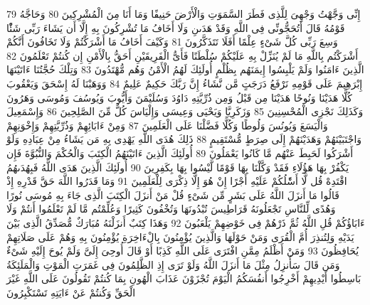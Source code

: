 \documentclass[20pt,a4paper]{article}
\begin{document}
{\tiny\colorbox{cl_aya}{79}} إِنِّى وَجَّهْتُ وَجْهِىَ لِلَّذِى فَطَرَ السَّمَوَتِ وَالْأَرْضَ حَنِيفًا وَمَا أَنَا مِنَ الْمُشْرِكِينَ
{\tiny\colorbox{cl_aya}{80}} وَحَاجَّهُ قَوْمُهُ قَالَ أَتُحَجُّونِّى فِى اللَّهِ وَقَدْ هَدَىنِ وَلَا أَخَافُ مَا تُشْرِكُونَ بِهِ إِلَّا أَن يَشَاءَ رَبِّى شَئًْا وَسِعَ رَبِّى كُلَّ شَىْءٍ عِلْمًا أَفَلَا تَتَذَكَّرُونَ
{\tiny\colorbox{cl_aya}{81}} وَكَيْفَ أَخَافُ مَا أَشْرَكْتُمْ وَلَا تَخَافُونَ أَنَّكُمْ أَشْرَكْتُم بِاللَّهِ مَا لَمْ يُنَزِّلْ بِهِ عَلَيْكُمْ سُلْطَنًا فَأَىُّ الْفَرِيقَيْنِ أَحَقُّ بِالْأَمْنِ إِن كُنتُمْ تَعْلَمُونَ
{\tiny\colorbox{cl_aya}{82}} الَّذِينَ ءَامَنُوا وَلَمْ يَلْبِسُوا إِيمَنَهُم بِظُلْمٍ أُولَئِكَ لَهُمُ الْأَمْنُ وَهُم مُّهْتَدُونَ
{\tiny\colorbox{cl_aya}{83}} وَتِلْكَ حُجَّتُنَا ءَاتَيْنَهَا إِبْرَهِيمَ عَلَى قَوْمِهِ نَرْفَعُ دَرَجَتٍ مَّن نَّشَاءُ إِنَّ رَبَّكَ حَكِيمٌ عَلِيمٌ
{\tiny\colorbox{cl_aya}{84}} وَوَهَبْنَا لَهُ إِسْحَقَ وَيَعْقُوبَ كُلًّا هَدَيْنَا وَنُوحًا هَدَيْنَا مِن قَبْلُ وَمِن ذُرِّيَّتِهِ دَاوُدَ وَسُلَيْمَنَ وَأَيُّوبَ وَيُوسُفَ وَمُوسَى وَهَرُونَ وَكَذَلِكَ نَجْزِى الْمُحْسِنِينَ
{\tiny\colorbox{cl_aya}{85}} وَزَكَرِيَّا وَيَحْيَى وَعِيسَى وَإِلْيَاسَ كُلٌّ مِّنَ الصَّلِحِينَ
{\tiny\colorbox{cl_aya}{86}} وَإِسْمَعِيلَ وَالْيَسَعَ وَيُونُسَ وَلُوطًا وَكُلًّا فَضَّلْنَا عَلَى الْعَلَمِينَ
{\tiny\colorbox{cl_aya}{87}} وَمِنْ ءَابَائِهِمْ وَذُرِّيَّتِهِمْ وَإِخْوَنِهِمْ وَاجْتَبَيْنَهُمْ وَهَدَيْنَهُمْ إِلَى صِرَطٍ مُّسْتَقِيمٍ
{\tiny\colorbox{cl_aya}{88}} ذَلِكَ هُدَى اللَّهِ يَهْدِى بِهِ مَن يَشَاءُ مِنْ عِبَادِهِ وَلَوْ أَشْرَكُوا لَحَبِطَ عَنْهُم مَّا كَانُوا يَعْمَلُونَ
{\tiny\colorbox{cl_aya}{89}} أُولَئِكَ الَّذِينَ ءَاتَيْنَهُمُ الْكِتَبَ وَالْحُكْمَ وَالنُّبُوَّةَ فَإِن يَكْفُرْ بِهَا هَؤُلَاءِ فَقَدْ وَكَّلْنَا بِهَا قَوْمًا لَّيْسُوا بِهَا بِكَفِرِينَ
{\tiny\colorbox{cl_aya}{90}} أُولَئِكَ الَّذِينَ هَدَى اللَّهُ فَبِهُدَىهُمُ اقْتَدِهْ قُل لَّا أَسَْٔلُكُمْ عَلَيْهِ أَجْرًا إِنْ هُوَ إِلَّا ذِكْرَى لِلْعَلَمِينَ
{\tiny\colorbox{cl_aya}{91}} وَمَا قَدَرُوا اللَّهَ حَقَّ قَدْرِهِ إِذْ قَالُوا مَا أَنزَلَ اللَّهُ عَلَى بَشَرٍ مِّن شَىْءٍ قُلْ مَنْ أَنزَلَ الْكِتَبَ الَّذِى جَاءَ بِهِ مُوسَى نُورًا وَهُدًى لِّلنَّاسِ تَجْعَلُونَهُ قَرَاطِيسَ تُبْدُونَهَا وَتُخْفُونَ كَثِيرًا وَعُلِّمْتُم مَّا لَمْ تَعْلَمُوا أَنتُمْ وَلَا ءَابَاؤُكُمْ قُلِ اللَّهُ ثُمَّ ذَرْهُمْ فِى خَوْضِهِمْ يَلْعَبُونَ
{\tiny\colorbox{cl_aya}{92}} وَهَذَا كِتَبٌ أَنزَلْنَهُ مُبَارَكٌ مُّصَدِّقُ الَّذِى بَيْنَ يَدَيْهِ وَلِتُنذِرَ أُمَّ الْقُرَى وَمَنْ حَوْلَهَا وَالَّذِينَ يُؤْمِنُونَ بِالْءَاخِرَةِ يُؤْمِنُونَ بِهِ وَهُمْ عَلَى صَلَاتِهِمْ يُحَافِظُونَ
{\tiny\colorbox{cl_aya}{93}} وَمَنْ أَظْلَمُ مِمَّنِ افْتَرَى عَلَى اللَّهِ كَذِبًا أَوْ قَالَ أُوحِىَ إِلَىَّ وَلَمْ يُوحَ إِلَيْهِ شَىْءٌ وَمَن قَالَ سَأُنزِلُ مِثْلَ مَا أَنزَلَ اللَّهُ وَلَوْ تَرَى إِذِ الظَّلِمُونَ فِى غَمَرَتِ الْمَوْتِ وَالْمَلَئِكَةُ بَاسِطُوا أَيْدِيهِمْ أَخْرِجُوا أَنفُسَكُمُ الْيَوْمَ تُجْزَوْنَ عَذَابَ الْهُونِ بِمَا كُنتُمْ تَقُولُونَ عَلَى اللَّهِ غَيْرَ الْحَقِّ وَكُنتُمْ عَنْ ءَايَتِهِ تَسْتَكْبِرُونَ
\end{document}
